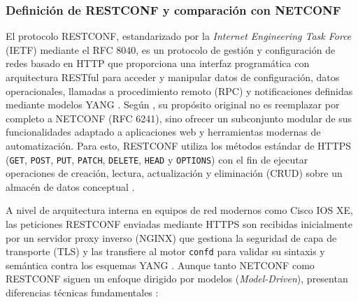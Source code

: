\documentclass[12pt,a4paper]{article}
\begin{document}
\subsubsection{Definición de RESTCONF y comparación con NETCONF}

El protocolo RESTCONF, estandarizado por la \textit{Internet Engineering Task Force} (IETF) mediante el RFC 8040, es un protocolo de gestión y configuración de redes basado en HTTP que proporciona una interfaz programática con arquitectura RESTful para acceder y manipular datos de configuración, datos operacionales, llamadas a procedimiento remoto (RPC) y notificaciones definidas mediante modelos YANG \parencite{cisco_restconf, granderath2023}. Según \textcite{bhat2023}, su propósito original no es reemplazar por completo a NETCONF (RFC 6241), sino ofrecer un subconjunto modular de sus funcionalidades adaptado a aplicaciones web y herramientas modernas de automatización. Para esto, RESTCONF utiliza los métodos estándar de HTTPS (\texttt{GET}, \texttt{POST}, \texttt{PUT}, \texttt{PATCH}, \texttt{DELETE}, \texttt{HEAD} y \texttt{OPTIONS}) con el fin de ejecutar operaciones de creación, lectura, actualización y eliminación (CRUD) sobre un almacén de datos conceptual \parencite{cisco_restconf, granderath2023}.

A nivel de arquitectura interna en equipos de red modernos como Cisco IOS XE, las peticiones RESTCONF enviadas mediante HTTPS son recibidas inicialmente por un servidor proxy inverso (NGINX) que gestiona la seguridad de capa de transporte (TLS) y las transfiere al motor \texttt{confd} para validar su sintaxis y semántica contra los esquemas YANG \parencite{cisco_restconf}. Aunque tanto NETCONF como RESTCONF siguen un enfoque dirigido por modelos (\textit{Model-Driven}), presentan diferencias técnicas fundamentales \parencite{bhat2023}:
\end{document}
